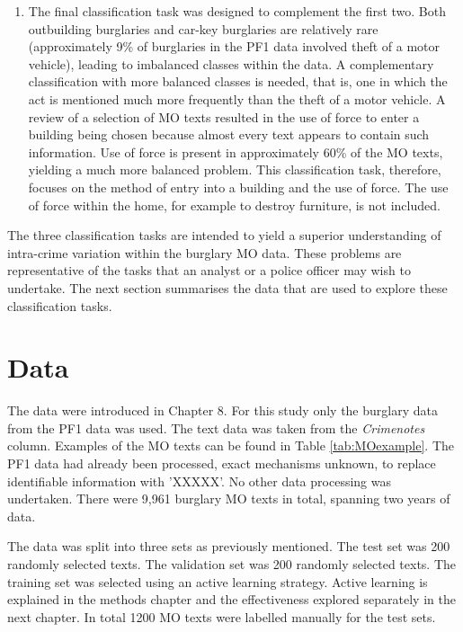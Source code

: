 \begin{enumerate}
 \item The final classification task was designed to complement the first two. Both outbuilding burglaries and car-key burglaries are relatively rare (approximately 9\% of burglaries in the PF1 data involved theft of a motor vehicle), leading to imbalanced classes within the data. A complementary classification with more balanced classes is needed, that is, one in which the act is mentioned much more frequently than the theft of a motor vehicle. A review of a selection of MO texts resulted in the use of force to enter a building being chosen because almost every text appears to contain such information. Use of force is present in approximately 60\% of the MO texts, yielding a much more balanced problem. This classification task, therefore, focuses on the method of entry into a building and the use of force. The use of force within the home, for example to destroy furniture, is not included.

\end{enumerate}


The three classification tasks are intended to yield a superior understanding of intra-crime variation within the burglary MO data. These problems are representative of the tasks that an analyst or a police officer may wish to undertake. The next section summarises the data that are used to explore these classification tasks.


\section{Data} The data were introduced in Chapter 8. For this study only the burglary data from the PF1 data was used. The text data was taken from the \emph{Crimenotes} column. Examples of the MO texts can be found in Table \ref{tab:MOexample}. The PF1 data had already been processed, exact mechanisms unknown, to replace identifiable information with 'XXXXX'. No other data processing was undertaken. There were 9,961 burglary MO texts in total, spanning two years of data.

The data was split into three sets as previously mentioned. The test set was 200 randomly selected texts. The validation set was 200 randomly selected texts. The training set was selected using an active learning strategy. Active learning is explained in the methods chapter and the effectiveness explored separately in the next chapter. In total 1200 MO texts were labelled manually  for the test sets. 


